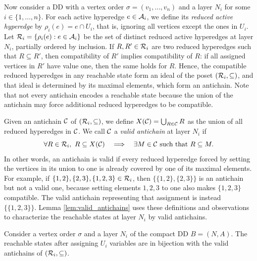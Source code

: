 Now consider a DD with a vertex order $\sigma=(v_1,\ldots,v_n)$ and a layer $N_i$ for some $i \in \{1,\ldots,n\}$. For each active hyperedge $e\in\mathcal{A}_i$, we define its \emph{reduced active hyperedge} by $\rho_i(e)=e\cap U_i$, that is, ignoring all vertices except the ones in $U_i$. Let $\mathcal{R}_i=\{\rho_i(e):e\in\mathcal{A}_i\} $ be the set of distinct reduced active hyperedges at layer $N_i$, partially ordered by inclusion. If $R,R'\in\mathcal{R}_i$ are two reduced hyperedges such that  $R\subseteq R'$, then compatibility of $R'$ implies compatibility of $R$: if all assigned vertices in $R'$ have value one, then the same holds for $R$. Hence, the compatible reduced hyperedges in any reachable state form an ideal of the poset $(\mathcal{R}_i,\subseteq)$, and that ideal is determined by its maximal elements, which form an antichain. Note that not every antichain encodes a reachable state because the union of the antichain may force additional reduced hyperedges to be compatible. 

Given an antichain $\mathcal{C}$ of $(\mathcal{R}_i, \subseteq)$, we define
$ X(\mathcal{C})=\bigcup_{R\in\mathcal{C}}R $ as the union of all reduced hyperedges in $\mathcal{C}$.
We call $\mathcal{C}$ a \emph{valid antichain} at layer $N_i$ if
\[
\forall R\in\mathcal{R}_i,\ R\subseteq X(\mathcal{C})
\quad\Longrightarrow\quad
\exists M\in\mathcal{C}\text{ such that }R\subseteq M.
\]
In other words, an antichain is valid if every reduced hyperedge forced by setting the vertices in its union to one is already covered by one of its maximal elements. For example, if $ \{1,2\},\{2,3\},\{1,2,3\}\in\mathcal{R}_i$,
then $\{\{1,2\},\{2,3\}\}$ is an antichain but not a valid one, because setting elements $1,2,3$ to one also makes $\{1,2,3\}$ compatible. The valid antichain
representing that assignment is instead $\{\{1,2,3\}\}$.  Lemma \ref{lem:valid_antichains} uses these definitions and observations to characterize the reachable states at layer $N_i$ by valid antichains.

\begin{lemma}
\label{lem:valid_antichains}
Consider a vertex order $\sigma$ and a layer $N_i$ of the compact DD $B=(N,A)$. The reachable states after assigning $U_i$ variables are in bijection with the valid antichains of $(\mathcal{R}_i,\subseteq)$.
\end{lemma}

